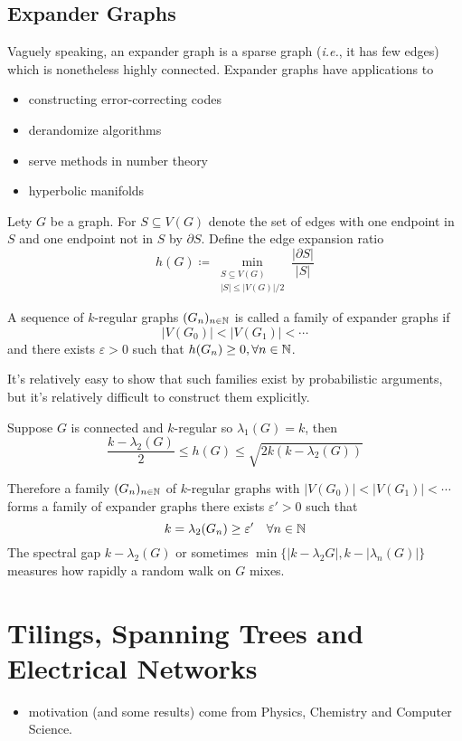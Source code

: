 \section{Expander Graphs}
Vaguely speaking, an expander graph is a sparse graph (\textit{i.e.}, it has few edges) which is nonetheless highly connected.
Expander graphs have applications to
\begin{itemize}
\item constructing error-correcting codes
\item derandomize algorithms
\item serve methods in number theory
\item hyperbolic manifolds
\end{itemize}

\begin{definition}
Lety \(G\) be a graph.
For \(S\subseteq V(G)\) denote the set of edges with one endpoint in \(S\) and one endpoint not in \(S\) by \(\partial S\).
Define the edge expansion ratio
\[ h(G)\coloneqq \min_{\substack{S\subseteq V(G)\\|S|\leq|V(G)|/2}} \frac{|\partial S|}{|S|} \]
\end{definition}
\begin{definition}
A sequence of \(k\)-regular graphs \((G_n)_{n\in\mathbb{N}}\) is called a family of expander graphs if
\[ |V(G_0)|<|V(G_1)|<\cdots \]
and there exists \(\varepsilon>0\) such that \(h(G_n)\geq0,\forall n\in\mathbb{N}\).
\end{definition}
\begin{remark}
It's relatively easy to show that such families exist by probabilistic arguments, but it's relatively difficult to construct them explicitly.
\end{remark}
\begin{theorem}
Suppose \(G\) is connected and \(k\)-regular so \(\lambda_1(G)=k\), then
\[ \frac{k-\lambda_2(G)}{2}\leq h(G)\leq \sqrt{2k(k-\lambda_2(G))} \]
\end{theorem}
Therefore a family \((G_n)_{n\in\mathbb{N}}\) of \(k\)-regular graphs with \(|V(G_0)|<|V(G_1)|<\cdots\) forms a family of expander graphs \iff there exists \(\varepsilon'>0\) such that
\[ k=\lambda_2(G_n)\geq\varepsilon' \quad \forall n\in\mathbb{N} \]
The spectral gap \(k-\lambda_2(G)\) or sometimes \( \min\{|k-\lambda_2{G}|,k-|\lambda_n(G)|\} \) measures how rapidly a random walk on \(G\) mixes.



\chapter{Tilings, Spanning Trees and Electrical Networks}
\begin{itemize}
\item motivation (and some results) come from Physics, Chemistry and Computer Science.
\end{itemize}

